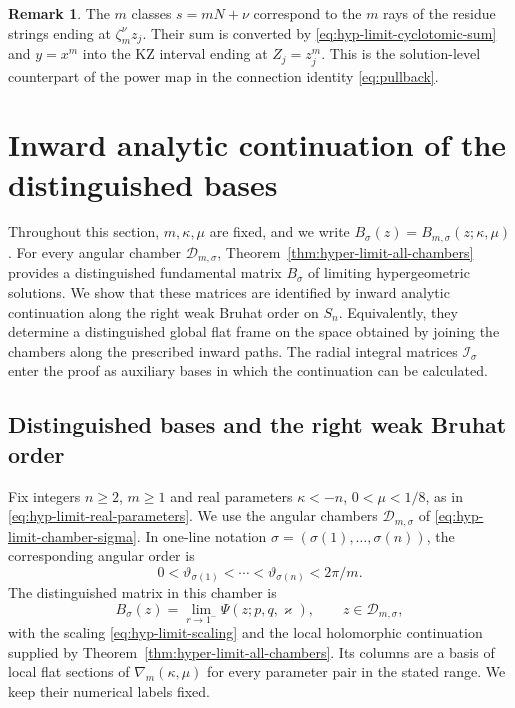 \documentclass[12pt]{amsart}
\theoremstyle{definition}
\numberwithin{equation}{section}
\theoremstyle{definition}
\newtheorem*{rem}{Remark}
\let\mc\mathcal
\let\ka\kappa
\let\si\sigma
\let\ge\geqslant
\def\beq{\begin{equation}}
\def\eeq{\end{equation}}
\begin{document}
\begin{rem}
The $m$ classes $s=mN+\nu$ correspond to the $m$ rays of
the residue strings ending at $\zeta_m^{\nu}z_j$.  Their sum
is converted by \eqref{eq:hyp-limit-cyclotomic-sum} and
$y=x^m$ into the KZ interval ending at $Z_j=z_j^m$.
This is the solution-level counterpart of the power map
in the connection identity \eqref{eq:pullback}.
\end{rem}




\clearpage
\section{Inward analytic continuation of the distinguished bases}
\label{sec:inward-formal}

Throughout this section, $m,\ka,\mu$ are fixed, and we write
$B_\si(z)=B_{m,\si}(z;\ka,\mu)$.
For every angular chamber $\mc D_{m,\si}$, Theorem~\ref{thm:hyper-limit-all-chambers}
provides a distinguished fundamental matrix $B_\si$ of limiting
hypergeometric solutions. We show that these matrices are identified
by inward analytic continuation along the right weak Bruhat order on
$S_n$. Equivalently, they determine a distinguished global flat frame
on the space obtained by joining the chambers along the prescribed
inward paths. The radial integral matrices $\mc I_\si$ enter the
proof as auxiliary bases in which the continuation can be calculated.

\subsection{Distinguished bases and the right weak Bruhat order}
\label{subsec:if-distinguished-order}

Fix integers $n\ge2$, $m\ge1$ and real parameters
$\ka<-n$, $0<\mu<1/8$, as in
\eqref{eq:hyp-limit-real-parameters}. We use the angular chambers
$\mc D_{m,\si}$ of \eqref{eq:hyp-limit-chamber-sigma}. In one-line
notation $\si=(\si(1),\ldots,\si(n))$, the corresponding angular
order is
\[
 0<\vartheta_{\si(1)}<\cdots<\vartheta_{\si(n)}<2\pi/m.
\]
The distinguished matrix in this chamber is
\beq\label{eq:if-distinguished-limit}
 B_\si(z)=\lim_{r\to1^-}\Psi(z;p,q,\varkappa),
 \qquad z\in\mc D_{m,\si},
\eeq
with the scaling \eqref{eq:hyp-limit-scaling} and the local
holomorphic continuation supplied by
Theorem~\ref{thm:hyper-limit-all-chambers}. Its columns are a basis
of local flat sections of $\nabla_m(\ka,\mu)$ for every parameter
pair in the stated range. We keep their numerical labels fixed.
\end{document}
